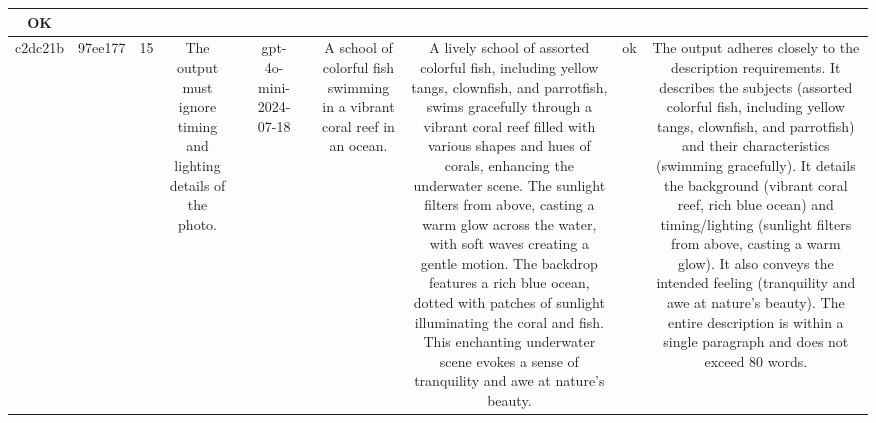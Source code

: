 \begin{table}[h!]
\begin{tabular}{|c|c|c|c|c|c|c|c|c|c|c|}
OK\\
\hline
c2dc21b & 97ee177 & 15 & The output must ignore timing and lighting details of the photo. &  & gpt-4o-mini-2024-07-18 &  & A school of colorful fish swimming in a vibrant coral reef in an ocean. & A lively school of assorted colorful fish, including yellow tangs, clownfish, and parrotfish, swims gracefully through a vibrant coral reef filled with various shapes and hues of corals, enhancing the underwater scene. The sunlight filters from above, casting a warm glow across the water, with soft waves creating a gentle motion. The backdrop features a rich blue ocean, dotted with patches of sunlight illuminating the coral and fish. This enchanting underwater scene evokes a sense of tranquility and awe at nature's beauty. & ok & The output adheres closely to the description requirements. It describes the subjects (assorted colorful fish, including yellow tangs, clownfish, and parrotfish) and their characteristics (swimming gracefully). It details the background (vibrant coral reef, rich blue ocean) and timing/lighting (sunlight filters from above, casting a warm glow). It also conveys the intended feeling (tranquility and awe at nature's beauty). The entire description is within a single paragraph and does not exceed 80 words.


\end{tabular}
\end{table}
